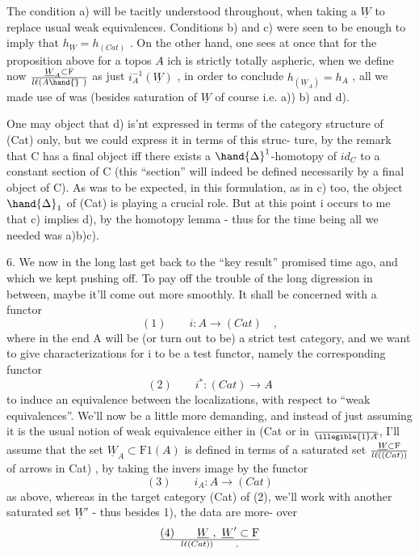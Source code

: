 
The condition a) will be tacitly understood throughout, when taking
a $\underline{W}$ to replace usual weak equivalences. Conditions b) and c)  were seen to
be enough to imply that $h_{\underline{W}} = h_{(Cat)}$ . On the other hand, one sees at
once that for the proposition above for a  topos $A\hat{}$ ich
is strictly totally aspheric, when we define now $\underline{W}_A \subset \mathrm{F}\over{l}{\ell}(A\hand{\hat{}}\ )$ as just
$i_A^{-1}(\underline{W})$ , in order to conclude $h_{(\underline{W}_A)} = h_{A\hat{}}$ , all we made use of was
(besides saturation of $\underline{W}$ of course i.e. a)) b) and d).

One may object that d) is'nt expressed in terms of the category
structure of (Cat) only, but we could express it in terms of this struc-%
ture, by the remark that C has a final object iff there exists a
$\hand{\Delta}^1$-homotopy of $id_C$ to a constant section of C (this ``section'' will indeed
be defined necessarily by a final object of C). As was to be expected,
in this formulation, as in c) too, the object $\hand{\Delta}_1$ of (Cat) is playing a
crucial role. But at this point i occurs to me that c) implies d),
by the homotopy lemma - thus for the time being all we needed was
a)b)c).

6. We now in the long last get back to the ``key result'' promised time
ago, and which we kept pushing off. To pay off the trouble of the long
digression in between, maybe it'll come out more smoothly. It shall be
concerned with a functor
\[ (1) \qquad i : A \longrightarrow (Cat) \quad , \]
where in the end A will be (or turn out to be) a strict test category,
and we want to give characterizations for i to be a  test functor, namely
the corresponding functor
\[ (2) \qquad i^{*} : (Cat) \longrightarrow A\hat{} \]
to induce an equivalence between the localizations, with respect to
``weak equivalences''.\hand{*} We'll now be a little more demanding, and instead 
of just assuming it is the usual notion of weak equivalence either in (Cat\hand{)}
or in $\over{\illegible{1}}{A}\hat{}$, I'll assume that the set $\underline{W}_A \subset \mathrm{F1}(A\hat{})$ is defined in terms of
a saturated set $\underline{W} \subset \mathrm{F}\over{l}{\ell}((Cat))$ of arrows in \hand{(}Cat) , by taking the invers
image by the functor
\[ (3) \qquad i_A : A\hat{} \rightarrow (Cat) \]
as above, whereas in the target category (Cat) of (2), we'll work
with another saturated set $\underline{W}'$ - thus besides 1), the data are more-%
over
\[ (4) \qquad \underline{W} \ , \ \underline{W}' \subset \mathrm{F}\over{l}{\ell}(Cat)) \qquad , \]

